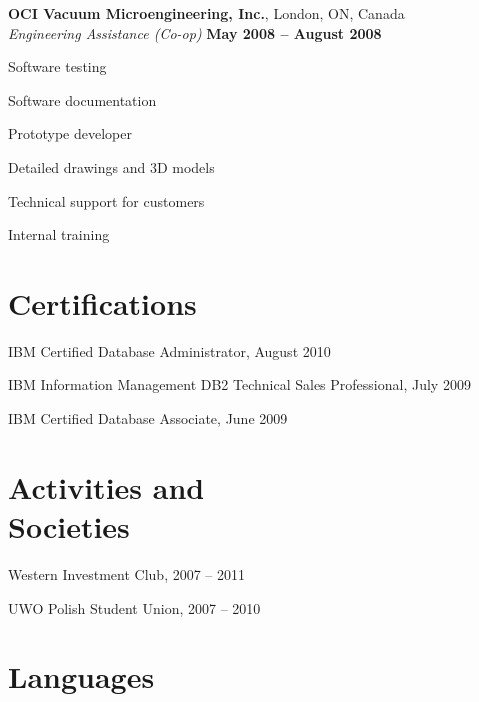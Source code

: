\documentclass[margin,line]{resume}
\begin{document}
\begin{resume}
	\textbf{OCI Vacuum Microengineering, Inc.}, London, ON, Canada	\vspace{2mm}\\\vspace{1mm}
	\textsl{Engineering Assistance (Co-op)}				\hfill\textbf{May 2008 -- August 2008}		\\\vspace{-3mm}
	\begin{list2}
		\item Software testing
		\item Software documentation
		\item Prototype developer
		\item Detailed drawings and 3D models
		\item Technical support for customers
		\item Internal training
	\end{list2}

\section{\mysidestyle Certifications}

\begin{list2}
	\item IBM Certified Database Administrator, August 2010
	\item IBM Information Management DB2 Technical Sales Professional, July 2009
	\item IBM Certified Database Associate, June 2009
\end{list2}

\section{\mysidestyle Activities and\\Societies}

\begin{list2}
	\item Western Investment Club, 2007 -- 2011
	\item UWO Polish Student Union, 2007 -- 2010
\end{list2}

\section{\mysidestyle Languages}


\end{resume}
\end{document}
